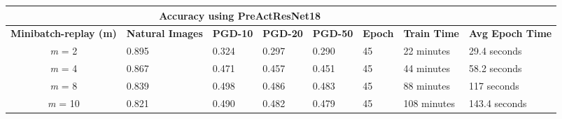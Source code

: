 \documentclass{article}
\begin{document}
\begin{table}[hbt!]
\begin{tabular}{|c|l|l|l|l|l|l|p{2cm}|}
\hline
\multicolumn{1}{|l|}{{ }}        & \multicolumn{4}{c|}{{ \textbf{Accuracy using PreActResNet18}}}                                                                                                                                                                            & \multicolumn{3}{l|}{{ }}                                                                                                                                                       \\ \hline
{ \textbf{Minibatch-replay (m)}} & \multicolumn{1}{p{1.5cm}|}{{ \textbf{Natural Images}}} & \multicolumn{1}{c|}{{ \textbf{PGD-10}}} & \multicolumn{1}{c|}{{ \textbf{PGD-20}}} & \multicolumn{1}{c|}{{ \textbf{PGD-50}}} & \multicolumn{1}{c|}{{ \textbf{Epoch}}} & \multicolumn{1}{c|}{{ \textbf{Train Time}}} & \multicolumn{1}{p{1.5cm}|}{{ \textbf{Avg Epoch Time}}} \\ \hline
{ \textit{m} = 2}                & { 0.895}                                        & { 0.324}                                & { 0.297}                                & { 0.290}                                & { 45}                                  & { 22 minutes}                               & { 29.4 seconds}                                 \\ \hline
{ \textit{m} = 4}                & { 0.867}                                        & { 0.471}                                & { 0.457}                                & { 0.451}                                & { 45}                                  & { 44 minutes}                               & { 58.2 seconds}                                 \\ \hline
{ \textit{m} = 8}                & { 0.839}                                        & { 0.498}                                & { 0.486}                                & { 0.483}                                & { 45}                                  & { 88 minutes}                               & { 117 seconds}                                  \\ \hline
{ \textit{m} = 10}               & { 0.821}                                        & { 0.490}                                & { 0.482}                                & { 0.479}                                & { 45}                                  & { 108 minutes}                              & { 143.4 seconds}                                \\ \hline
\end{tabular}
\end{table}
\end{document}
